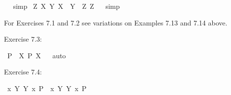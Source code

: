 \begin{isabellebody}
\isadelimproof
\ %
\endisadelimproof
%
\isatagproof
{}\isamarkupfalse%
\ simp%
\endisatagproof
{\isafoldproof}%
%
\isadelimproof
%
\endisadelimproof
\isanewline
{}\isamarkupfalse%
\ {\isachardoublequoteopen}{\isasymlfloor}\isactrlbold {\isasymforall}Z{\isacharcolon}{\isacharcolon}{\isasymup}{\isasymzero}{\isachardot}\ {\isacharparenleft}{\isasymlambda}X{\isacharcolon}{\isacharcolon}{\isasymup}{\isasymzero}{\isachardot}\ \isactrlbold {\isasymbox}{\isacharparenleft}{\isacharparenleft}{\isasymlambda}Y{\isacharcolon}{\isacharcolon}{\isasymup}{\isasymzero}{\isachardot}\ X\ \isactrlbold {\isasymapprox}\ Y{\isacharparenright}\ \ Z{\isacharparenright}{\isacharparenright}\ Z{\isasymrfloor}{\isachardoublequoteclose}%
\isadelimproof
\ %
\endisadelimproof
%
\isatagproof
{}\isamarkupfalse%
\ simp%
\endisatagproof
{\isafoldproof}%
%
\isadelimproof
%
\endisadelimproof
%
\isamarkuptrue%
%
\begin{isamarkuptext}%
For Exercises 7.1 and 7.2 see variations on Examples 7.13 and 7.14 above.%
\end{isamarkuptext}\isamarkuptrue%
%
\begin{isamarkuptext}%
Exercise 7.3:%
\end{isamarkuptext}\isamarkuptrue%
\isamarkupfalse%
\ {\isachardoublequoteopen}{\isasymlfloor}\isactrlbold {\isasymdiamond}\isactrlbold {\isasymexists}{\isacharparenleft}P{\isacharcolon}{\isacharcolon}{\isasymup}{\isasymlangle}{\isasymzero}{\isasymrangle}{\isacharparenright}\ \isactrlbold {\isasymrightarrow}\ {\isacharparenleft}\isactrlbold {\isasymexists}X{\isacharcolon}{\isacharcolon}{\isasymup}{\isasymzero}{\isachardot}\ \isactrlbold {\isasymdiamond}{\isacharparenleft}P\ \isactrlbold {\isasymdownharpoonleft}X{\isacharparenright}{\isacharparenright}{\isasymrfloor}{\isachardoublequoteclose}%
\isadelimproof
\ %
\endisadelimproof
%
\isatagproof
{}\isamarkupfalse%
\ auto%
\endisatagproof
{\isafoldproof}%
%
\isadelimproof
%
\endisadelimproof
%
\begin{isamarkuptext}%
Exercise 7.4:%
\end{isamarkuptext}\isamarkuptrue%
\isamarkupfalse%
\ {\isachardoublequoteopen}{\isasymlfloor}\isactrlbold {\isasymdiamond}{\isacharparenleft}\isactrlbold {\isasymexists}x{\isacharcolon}{\isacharcolon}{\isasymzero}{\isachardot}\ {\isacharparenleft}{\isasymlambda}Y{\isachardot}\ Y\ x{\isacharparenright}\ \isactrlbold {\isasymdown}{\isacharparenleft}P{\isacharcolon}{\isacharcolon}{\isasymup}{\isasymlangle}{\isasymzero}{\isasymrangle}{\isacharparenright}{\isacharparenright}\ \isactrlbold {\isasymrightarrow}\ {\isacharparenleft}\isactrlbold {\isasymexists}x{\isachardot}\ {\isacharparenleft}{\isasymlambda}Y{\isachardot}\ \isactrlbold {\isasymdiamond}{\isacharparenleft}Y\ x{\isacharparenright}{\isacharparenright}\ \isactrlbold {\isasymdown}P{\isacharparenright}{\isasymrfloor}{\isachardoublequoteclose}\ \isanewline

\end{isabellebody}

